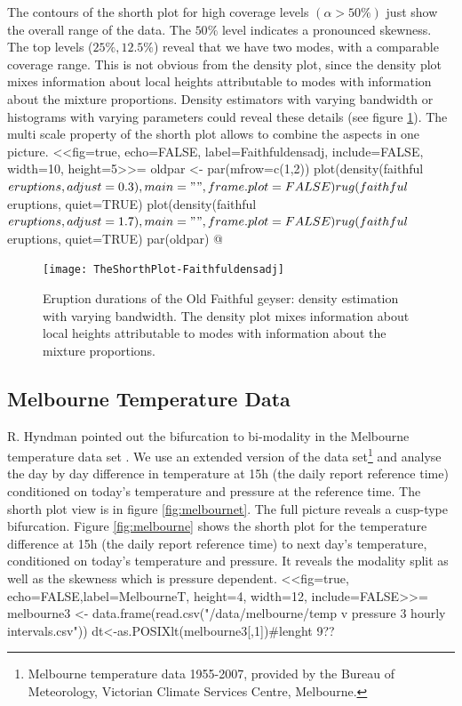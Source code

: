 \documentclass[dvips,12pt,a4paper,twoside]{amsart}
\newcommand{\gsnote}[1]{}
\newcommand{\gsnote}[1]{\marginpar{\textcolor{green}{#1}}}%
\begin{document}
The contours of the shorth plot for high coverage levels $(\alpha > 50\%)$ just show the overall 
range of the data. The $50\%$ level indicates a pronounced skewness. The top levels 
($25\%, 12.5\%$) reveal 
that we have two modes, with a comparable coverage range. This is not obvious from 
the density plot, since the density plot mixes information about local heights attributable 
to modes with information about the mixture proportions.\gsnote{figure added to illustrate this} Density estimators with varying bandwidth or histograms with varying parameters could reveal these details (see figure \ref{fig:faithfuldensadj}). The multi scale property of the shorth plot allows to combine the aspects in one picture.
<<fig=true, echo=FALSE, label=Faithfuldensadj, include=FALSE, width=10, height=5>>=
oldpar <- par(mfrow=c(1,2))
plot(density(faithful$eruptions,adjust=0.3),main="", frame.plot=FALSE)
rug(faithful$eruptions, quiet=TRUE)
plot(density(faithful$eruptions,adjust=1.7),main="", frame.plot=FALSE)
rug(faithful$eruptions, quiet=TRUE)
par(oldpar)
@
\begin{figure}[htb]
\texttt{[image: TheShorthPlot-Faithfuldensadj]}
\caption{Eruption durations of the Old Faithful geyser:  density estimation with varying bandwidth. The density plot mixes information about local heights attributable 
to modes with information about the mixture proportions. }\label{fig:faithfuldensadj}
\end{figure}

%
%
\subsection{Melbourne Temperature Data}
%
R. Hyndman pointed out the bifurcation to bi-modality in the Melbourne temperature data set \cite{Hyndman1996Estimating-and-}. We use an extended version of the data set\footnote{Melbourne temperature data 1955-2007, provided by the Bureau of Meteorology, Victorian Climate Services Centre, Melbourne.} and analyse the day by day difference in temperature   at 15h (the daily report reference time) conditioned on today's temperature and pressure at the reference time.  The shorth plot view is in figure \ref{fig:melbournet}. The full picture reveals a cusp-type bifurcation. Figure \ref{fig:melbourne} shows the shorth plot for the temperature difference at 15h (the daily report reference time) to next day's temperature, conditioned on today's temperature and pressure. It reveals the modality split as well as the skewness which is pressure dependent.
<<fig=true, echo=FALSE,label=MelbourneT, height=4, width=12, include=FALSE>>=
melbourne3 <- data.frame(read.csv("/data/melbourne/temp v pressure 3 hourly intervals.csv"))
dt<-as.POSIXlt(melbourne3[,1])#lenght 9??
\end{document}

